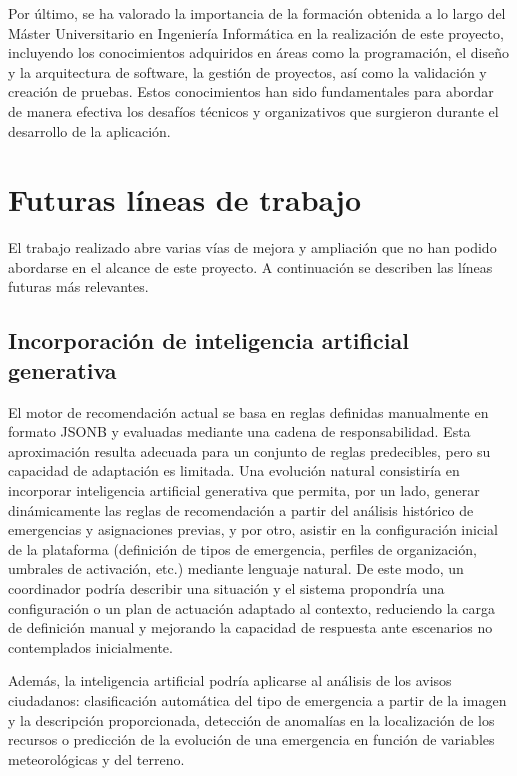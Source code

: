 Por último, se ha valorado la importancia de la formación obtenida a lo largo del Máster Universitario en Ingeniería Informática en la realización de este proyecto, incluyendo los conocimientos adquiridos en áreas como la programación, el diseño y la arquitectura de software, la gestión de proyectos, así como la validación y creación de pruebas. Estos conocimientos han sido fundamentales para abordar de manera efectiva los desafíos técnicos y organizativos que surgieron durante el desarrollo de la aplicación.

\section{Futuras líneas de trabajo}
\label{sec:futuro}

El trabajo realizado abre varias vías de mejora y ampliación que no han podido abordarse en el alcance de este proyecto. A continuación se describen las líneas futuras más relevantes.

\subsection{Incorporación de inteligencia artificial generativa}

El motor de recomendación actual se basa en reglas definidas manualmente en formato JSONB y evaluadas mediante una cadena de responsabilidad. Esta aproximación resulta adecuada para un conjunto de reglas predecibles, pero su capacidad de adaptación es limitada. Una evolución natural consistiría en incorporar inteligencia artificial generativa que permita, por un lado, generar dinámicamente las reglas de recomendación a partir del análisis histórico de emergencias y asignaciones previas, y por otro, asistir en la configuración inicial de la plataforma (definición de tipos de emergencia, perfiles de organización, umbrales de activación, etc.) mediante lenguaje natural. De este modo, un coordinador podría describir una situación y el sistema propondría una configuración o un plan de actuación adaptado al contexto, reduciendo la carga de definición manual y mejorando la capacidad de respuesta ante escenarios no contemplados inicialmente.

Además, la inteligencia artificial podría aplicarse al análisis de los avisos ciudadanos: clasificación automática del tipo de emergencia a partir de la imagen y la descripción proporcionada, detección de anomalías en la localización de los recursos o predicción de la evolución de una emergencia en función de variables meteorológicas y del terreno.

